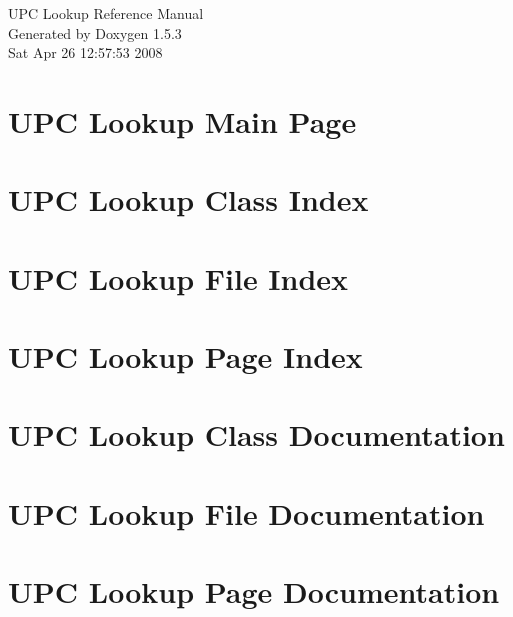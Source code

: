 \documentclass[letterpaper]{book}
\begin{document}
\begin{titlepage}
\vspace*{7cm}
\begin{center}
{\Large UPC Lookup Reference Manual}\\
\vspace*{1cm}
{\large Generated by Doxygen 1.5.3}\\
\vspace*{0.5cm}
{\small Sat Apr 26 12:57:53 2008}\\
\end{center}
\end{titlepage}
\clearemptydoublepage
{}
\tableofcontents
\clearemptydoublepage
{}
\chapter{UPC Lookup Main Page}
\label{index}\hypertarget{index}{}
\chapter{UPC Lookup Class Index}

\chapter{UPC Lookup File Index}

\chapter{UPC Lookup Page Index}

\chapter{UPC Lookup Class Documentation}

\chapter{UPC Lookup File Documentation}










\chapter{UPC Lookup Page Documentation}



\printindex
\end{document}
